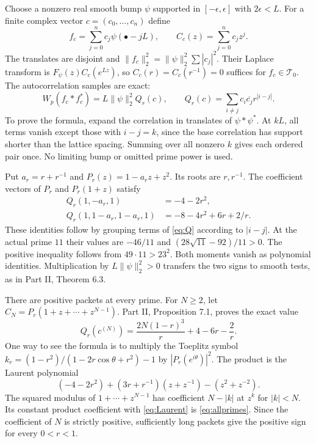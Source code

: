 \documentclass[11pt,letterpaper]{article}
\theoremstyle{definition}
\theoremstyle{remark}
\newcommand{\T}{\mathcal T}
\begin{document}
Choose a nonzero real smooth bump $\psi$ supported in
$[-\epsilon,\epsilon]$ with $2\epsilon<L$. For a finite complex
vector $c=(c_0,\ldots,c_n)$ define
\begin{equation}
 f_c=\sum_{j=0}^n c_j\psi(\bullet-jL),\qquad
 C_c(z)=\sum_{j=0}^nc_jz^j.
 \label{eq:packet}
\end{equation}
The translates are disjoint and
$\|f_c\|_2^2=\|\psi\|_2^2\sum|c_j|^2$.
Their Laplace transform is $F_\psi(z)C_c(e^{Lz})$, so
$C_c(r)=C_c(r^{-1})=0$ suffices for $f_c\in\T_0$.
The autocorrelation samples are exact:
\begin{equation}
 W_p(f_c*f_c^*)=L\|\psi\|_2^2Q_r(c),\qquad
 Q_r(c)=\sum_{i\ne j}c_i\overline{c_j}r^{|i-j|}.
 \label{eq:Q}
\end{equation}
To prove the formula, expand the correlation in translates of
$\psi*\psi^*$. At $kL$, all terms vanish except those with
$i-j=k$, since the base correlation has support shorter than
the lattice spacing. Summing over all nonzero $k$ gives each
ordered pair once. No limiting bump or omitted prime power is
used.

Put $a_r=r+r^{-1}$ and $P_r(z)=1-a_rz+z^2$.
Its roots are $r,r^{-1}$. The coefficient vectors of $P_r$
and $P_r(1+z)$ satisfy
\begin{align}
 Q_r(1,-a_r,1)&=-4-2r^2,\label{eq:Qminus}\\
 Q_r(1,1-a_r,1-a_r,1)&=-8-4r^2+6r+2/r.
 \label{eq:Qplus}
\end{align}
These identities follow by grouping terms of \eqref{eq:Q}
according to $|i-j|$. At the actual prime $11$ their values
are $-46/11$ and $(28\sqrt{11}-92)/11>0$. The positive
inequality follows from $49\cdot11>23^2$. Both moments vanish
as polynomial identities. Multiplication by
$L\|\psi\|_2^2>0$ transfers the two signs to smooth tests,
as in Part II, Theorem 6.3.

There are positive packets at every prime. For $N\ge2$, let
$C_N=P_r(1+z+\cdots+z^{N-1})$. Part II, Proposition 7.1,
proves the exact value
\begin{equation}
 Q_r(c^{(N)})=\frac{2N(1-r)^3}{r}+4-6r-\frac2r.
 \label{eq:allprimes}
\end{equation}
One way to see the formula is to multiply the Toeplitz symbol
$k_r=(1-r^2)/(1-2r\cos\theta+r^2)-1$ by $|P_r(e^{i\theta})|^2$.
The product is the Laurent polynomial
\begin{equation}
 (-4-2r^2)+(3r+r^{-1})(z+z^{-1})-(z^2+z^{-2}).
 \label{eq:Laurent}
\end{equation}
The squared modulus of $1+\cdots+z^{N-1}$ has coefficient
$N-|k|$ at $z^k$ for $|k|<N$. Its constant product coefficient
with \eqref{eq:Laurent} is \eqref{eq:allprimes}. Since the
coefficient of $N$ is strictly positive, sufficiently long
packets give the positive sign for every $0<r<1$.
\end{document}
